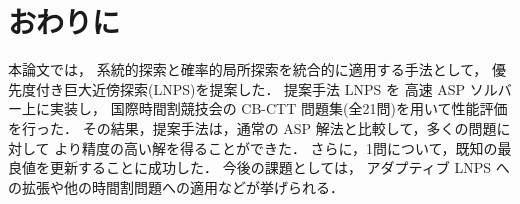 \section{おわりに}

本論文では，
系統的探索と確率的局所探索を統合的に適用する手法として，
優先度付き巨大近傍探索(LNPS)を提案した．
提案手法 LNPS を 高速 ASP ソルバー{\clingo}上に実装し，
国際時間割競技会の CB-CTT 問題集(全21問)を用いて性能評価を行った．
その結果，提案手法は，通常の ASP 解法と比較して，多くの問題に対して
より精度の高い解を得ることができた．
さらに，1問について，既知の最良値を更新することに成功した．
今後の課題としては，
アダプティブ LNPS への拡張や他の時間割問題への適用などが挙げられる．


